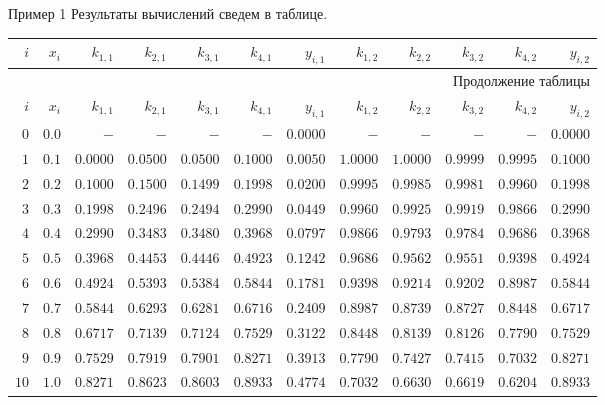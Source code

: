 \documentclass[aspectratio=169, mathserif]{beamer}	%
\begin{document}
\begin{frame}[fragile, ]{Пример 1}
\scriptsize
Результаты вычислений сведем в таблице.
\vfill
\begin{longtable}{|r|r|r|r|r|r|r|r|r|r|r|r|}

	\hline
	\multicolumn{1}{|r|}{$i$} & \multicolumn{1}{r|}{$x_i$} & \multicolumn{1}{r|}{$k_{1,1}$} & \multicolumn{1}{r|}{$k_{2,1}$} & \multicolumn{1}{r|}{$k_{3,1}$} & \multicolumn{1}{r|}{$k_{4,1}$} & \multicolumn{1}{r|}{$y_{i,1}$} & \multicolumn{1}{r|}{$k_{1,2}$} & \multicolumn{1}{r|}{$k_{2,2}$} & \multicolumn{1}{r|}{$k_{3,2}$} & \multicolumn{1}{r|}{$k_{4,2}$} & \multicolumn{1}{r|}{$y_{i,2}$}  \\
	\hline
	\endfirsthead

	\multicolumn{12}{r}{Продолжение таблицы \thetable{}} \\
	\hline
	\multicolumn{1}{|r|}{$i$} & \multicolumn{1}{r|}{$x_i$} & \multicolumn{1}{r|}{$k_{1,1}$} & \multicolumn{1}{r|}{$k_{2,1}$} & \multicolumn{1}{r|}{$k_{3,1}$} & \multicolumn{1}{r|}{$k_{4,1}$} & \multicolumn{1}{r|}{$y_{i,1}$} & \multicolumn{1}{r|}{$k_{1,2}$} & \multicolumn{1}{r|}{$k_{2,2}$} & \multicolumn{1}{r|}{$k_{3,2}$} & \multicolumn{1}{r|}{$k_{4,2}$} & \multicolumn{1}{r|}{$y_{i,2}$}  \\
	\hline
	\endhead

	$0$ & $0.0$ & $-$ & $-$ & $-$ & $-$ & $0.0000$ & $-$ & $-$ & $-$ & $-$ & $0.0000$\\
	\hline
	$1$ & $0.1$ & $0.0000$ & $0.0500$ & $0.0500$ & $0.1000$ & $0.0050$ & $1.0000$ & $1.0000$ & $0.9999$ & $0.9995$ & $0.1000$\\
	\hline
	$2$ & $0.2$ & $0.1000$ & $0.1500$ & $0.1499$ & $0.1998$ & $0.0200$ & $0.9995$ & $0.9985$ & $0.9981$ & $0.9960$ & $0.1998$\\
	\hline
	$3$ & $0.3$ & $0.1998$ & $0.2496$ & $0.2494$ & $0.2990$ & $0.0449$ & $0.9960$ & $0.9925$ & $0.9919$ & $0.9866$ & $0.2990$\\
	\hline
	$4$ & $0.4$ & $0.2990$ & $0.3483$ & $0.3480$ & $0.3968$ & $0.0797$ & $0.9866$ & $0.9793$ & $0.9784$ & $0.9686$ & $0.3968$\\
	\hline
	$5$ & $0.5$ & $0.3968$ & $0.4453$ & $0.4446$ & $0.4923$ & $0.1242$ & $0.9686$ & $0.9562$ & $0.9551$ & $0.9398$ & $0.4924$\\
	\hline
	$6$ & $0.6$ & $0.4924$ & $0.5393$ & $0.5384$ & $0.5844$ & $0.1781$ & $0.9398$ & $0.9214$ & $0.9202$ & $0.8987$ & $0.5844$\\
	\hline
	$7$ & $0.7$ & $0.5844$ & $0.6293$ & $0.6281$ & $0.6716$ & $0.2409$ & $0.8987$ & $0.8739$ & $0.8727$ & $0.8448$ & $0.6717$\\
	\hline
	$8$ & $0.8$ & $0.6717$ & $0.7139$ & $0.7124$ & $0.7529$ & $0.3122$ & $0.8448$ & $0.8139$ & $0.8126$ & $0.7790$ & $0.7529$\\
	\hline
	$9$ & $0.9$ & $0.7529$ & $0.7919$ & $0.7901$ & $0.8271$ & $0.3913$ & $0.7790$ & $0.7427$ & $0.7415$ & $0.7032$ & $0.8271$\\
	\hline
	$10$ & $1.0$ & $0.8271$ & $0.8623$ & $0.8603$ & $0.8933$ & $0.4774$ & $0.7032$ & $0.6630$ & $0.6619$ & $0.6204$ & $0.8933$\\


\end{longtable}
\end{frame}
\end{document}
